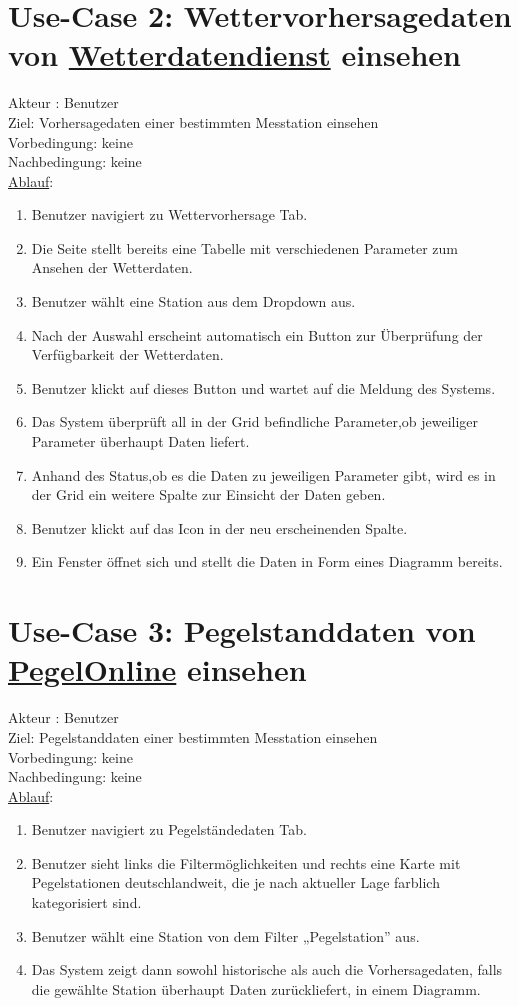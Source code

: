 \documentclass[a4paper,12pt]{scrreprt}
\begin{document}
	\section*{\small \textbf{Use-Case 2: Wettervorhersagedaten von \href{https://wetterdienst.readthedocs.io/en/latest/} {Wetterdatendienst} einsehen}}
	Akteur : Benutzer\\
	Ziel:  Vorhersagedaten einer bestimmten Messtation einsehen\\
	Vorbedingung: keine\\
	Nachbedingung: keine\\
	\underline{Ablauf}:
	\begin{enumerate}
		\item Benutzer navigiert zu  Wettervorhersage Tab.
		\item Die Seite stellt bereits eine Tabelle mit verschiedenen Parameter zum Ansehen der Wetterdaten.
		\item Benutzer wählt eine Station aus dem Dropdown aus.
		\item Nach der Auswahl erscheint automatisch ein Button zur Überprüfung der Verfügbarkeit der Wetterdaten.
		\item Benutzer klickt auf dieses Button und wartet auf die Meldung des Systems.
		\item Das System überprüft all in der Grid befindliche Parameter,ob jeweiliger Parameter überhaupt Daten liefert. 
		\item Anhand des Status,ob es die Daten zu jeweiligen Parameter gibt, wird es in der Grid ein weitere Spalte zur Einsicht der Daten geben. 
		\item Benutzer klickt auf das Icon in der neu erscheinenden Spalte.
		\item Ein Fenster öffnet sich und stellt die Daten in Form eines Diagramm bereits. 
	\end{enumerate}
	\section*{\small \textbf{Use-Case 3: Pegelstanddaten von \href{https://www.pegelonline.wsv.de/gast/start} {PegelOnline} einsehen}}
	Akteur : Benutzer\\
	Ziel:  Pegelstanddaten einer bestimmten Messtation einsehen\\
	Vorbedingung: keine\\
	Nachbedingung: keine\\
	\underline{Ablauf}:
	\begin{enumerate}
		\item Benutzer navigiert zu Pegelständedaten Tab.
		\item Benutzer sieht links die Filtermöglichkeiten und rechts eine Karte mit Pegelstationen deutschlandweit, die je nach aktueller Lage farblich kategorisiert sind.
		\item Benutzer wählt eine Station von dem Filter „Pegelstation” aus.
		\item Das System zeigt dann sowohl historische als auch die Vorhersagedaten, falls die gewählte Station überhaupt Daten zurückliefert, in einem Diagramm.
	\end{enumerate}
\end{document}
